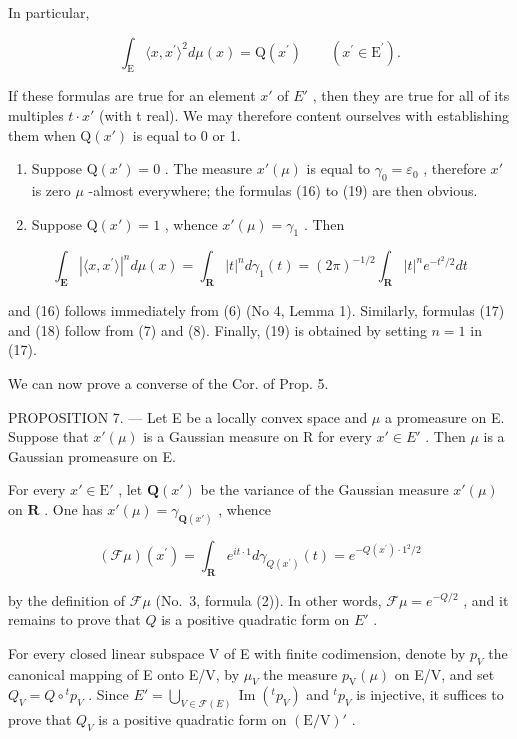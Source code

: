In particular,

\[
\int_ {\mathrm{E}} \langle x, x ^ {\prime} \rangle^ {2} d \mu (x) = \mathrm{Q} (x ^ {\prime}) \qquad (x ^ {\prime} \in \mathrm{E} ^ {\prime}).\tag{19}
\]

If these formulas are true for an element \(x'\) of \(E'\) , then they are true for all of its multiples \(t \cdot x'\) (with t real). We may therefore content ourselves with establishing them when \(\mathrm{Q}(x')\) is equal to 0 or 1.

\begin{enumerate}
\def\labelenumi{\alph{enumi})}
\item
  Suppose \(\mathrm{Q}(x') = 0\) . The measure \(x'(\mu)\) is equal to \(\gamma_{0} = \varepsilon_{0}\) , therefore \(x'\) is zero \(\mu\) -almost everywhere; the formulas (16) to (19) are then obvious.
\item
  Suppose \(\mathrm{Q}(x') = 1\) , whence \(x'(\mu) = \gamma_{1}\) . Then
\end{enumerate}

\[
\int_ {\mathbf {E}} | \langle x, x ^ {\prime} \rangle | ^ {n} d \mu (x) = \int_ {\mathbf {R}} | t | ^ {n} d \gamma_ {1} (t) = (2 \pi) ^ {- 1 / 2} \int_ {\mathbf {R}} | t | ^ {n} e ^ {- t ^ {2} / 2} d t
\]

and (16) follows immediately from (6) (No 4, Lemma 1). Similarly, formulas (17) and (18) follow from (7) and (8). Finally, (19) is obtained by setting \(n = 1\) in (17).

We can now prove a converse of the Cor. of Prop. 5.

PROPOSITION 7. --- Let E be a locally convex space and \(\mu\) a promeasure on E. Suppose that \(x'(\mu)\) is a Gaussian measure on R for every \(x' \in E'\) . Then \(\mu\) is a Gaussian promeasure on E.

For every \(x' \in \mathrm{E}'\) , let \(\mathbf{Q}(x')\) be the variance of the Gaussian measure \(x'(\mu)\) on \(\mathbf{R}\) . One has \(x'(\mu) = \gamma_{\mathbf{Q}(x')}\) , whence

\[
(\mathcal {F} \mu) (x ^ {\prime}) = \int_ {\mathbf {R}} e ^ {i t \cdot 1} d \gamma_ {Q (x ^ {\prime})} (t) = e ^ {- Q (x ^ {\prime}) \cdot 1 ^ {2} / 2}
\]

by the definition of \(\mathcal{F}\mu\) (No.~3, formula (2)). In other words, \(\mathcal{F}\mu = e^{-Q/2}\) , and it remains to prove that \(Q\) is a positive quadratic form on \(E'\) .

For every closed linear subspace V of E with finite codimension, denote by \(p_{V}\) the canonical mapping of E onto E/V, by \(\mu_{V}\) the measure \(p_{\mathrm{V}}(\mu)\) on E/V, and set \(Q_{V} = Q \circ {}^{t} p_{V}\) . Since \(E' = \bigcup_{V \in \mathcal{F}(E)} \operatorname{Im}({}^{t} p_{V})\) and \({}^{t} p_{V}\) is injective, it suffices to prove that \(Q_{V}\) is a positive quadratic form on \((\mathrm{E}/\mathrm{V})'\) .

